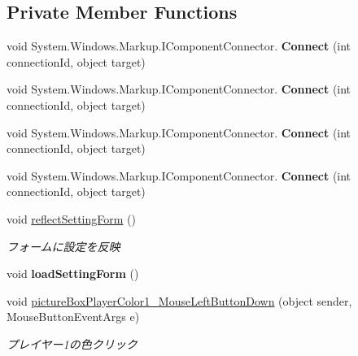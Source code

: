\subsection*{Private Member Functions}
\begin{DoxyCompactItemize}
\item 
\mbox{\label{class_reversi4color_wpf_1_1_setting_window_a8848852f763c2b7f4eca1da70753081c}} 
void System.\+Windows.\+Markup.\+I\+Component\+Connector. {\bfseries Connect} (int connection\+Id, object target)
\item 
\mbox{\label{class_reversi4color_wpf_1_1_setting_window_a8848852f763c2b7f4eca1da70753081c}} 
void System.\+Windows.\+Markup.\+I\+Component\+Connector. {\bfseries Connect} (int connection\+Id, object target)
\item 
\mbox{\label{class_reversi4color_wpf_1_1_setting_window_a8848852f763c2b7f4eca1da70753081c}} 
void System.\+Windows.\+Markup.\+I\+Component\+Connector. {\bfseries Connect} (int connection\+Id, object target)
\item 
\mbox{\label{class_reversi4color_wpf_1_1_setting_window_a8848852f763c2b7f4eca1da70753081c}} 
void System.\+Windows.\+Markup.\+I\+Component\+Connector. {\bfseries Connect} (int connection\+Id, object target)
\item 
void \hyperlink{class_reversi4color_wpf_1_1_setting_window_a768840bbf4baf723e039d187a7ee3def}{reflect\+Setting\+Form} ()
\begin{DoxyCompactList}\small\item\em フォームに設定を反映 \end{DoxyCompactList}\item 
\mbox{\label{class_reversi4color_wpf_1_1_setting_window_a524332372bd67c0bf1c2f5f6c9f75689}} 
void {\bfseries load\+Setting\+Form} ()
\item 
void \hyperlink{class_reversi4color_wpf_1_1_setting_window_aeb017c6106fd3bd79083e1326623ef8b}{picture\+Box\+Player\+Color1\+\_\+\+Mouse\+Left\+Button\+Down} (object sender, Mouse\+Button\+Event\+Args e)
\begin{DoxyCompactList}\small\item\em プレイヤー1の色クリック \end{DoxyCompactList}\item 

\end{DoxyCompactItemize}
